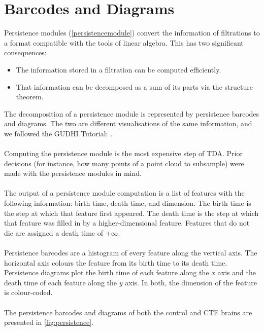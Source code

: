 \section{Barcodes and Diagrams}
Persistence modules (\cref{persistencemodule}) convert the information of filtrations to a format compatible with the tools of linear algebra. This has two significant consequences:
\begin{itemize}
    \item The information stored in a filtration can be computed efficiently.
    \item That information can be decomposed as a sum of its parts via the structure theorem.
\end{itemize}
The decomposition of a persistence module is represented by persistence barcodes and diagrams. The two are different visualisations of the same information, and we followed the GUDHI Tutorial: \cite{gudhi_tutorial_persistence}.
\\\\
Computing the persistence module is the most expensive step of TDA. Prior decisions (for instance, how many points of a point cloud to subsample) were made with the persistence modules in mind.
\\\\
The output of a persistence module computation is a list of features with the following information: birth time, death time, and dimension. The birth time is the step at which that feature first appeared. The death time is the step at which that feature was filled in by a higher-dimensional feature. Features that do not die are assigned a death time of $+\infty$. 
\\\\
Persistence barcodes are a histogram of every feature along the vertical axis. The horizontal axis colours the feature from its birth time to its death time. Persistence diagrams plot the birth time of each feature along the $x$ axis and the death time of each feature along the $y$ axis. In both, the dimension of the feature is colour-coded.
\\\\
The persistence barcodes and diagrams of both the control and CTE brains are presented in \cref{fig:persistence}.

